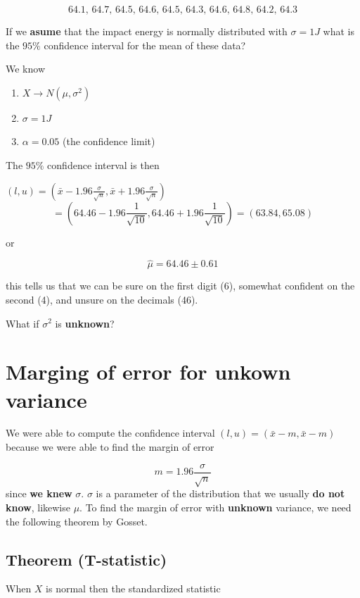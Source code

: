 \documentclass[
]{book}
\providecommand{\tightlist}{%
  \setlength{\itemsep}{0pt}\setlength{\parskip}{0pt}}
\begin{document}
\[64.1,\, 64.7,\, 64.5,\, 64.6,\, 64.5,\, 64.3,\, 64.6,\, 64.8,\, 64.2,\, 64.3\]

If we \textbf{asume} that the impact energy is normally distributed with \(\sigma=1J\) what is the \(95\%\) confidence interval for the mean of these data?

We know

\begin{enumerate}
\def\labelenumi{\arabic{enumi}.}
\tightlist
\item
  \(X \rightarrow N(\mu, \sigma^2)\)
\item
  \(\sigma=1J\)
\item
  \(\alpha=0.05\) (the confidence limit)
\end{enumerate}

The \(95\%\) confidence interval is then

\((l,u)=(\bar{x}-1.96 \frac{\sigma}{\sqrt{n}}, \bar{x}+1.96 \frac{\sigma}{\sqrt{n}})\)
\[=(64.46-1.96 \frac{1}{\sqrt{10}}, 64.46+1.96  \frac{1}{\sqrt{10}})=(63.84,65.08)\]

or

\[\hat{\mu}=64.46 \pm 0.61\]

this tells us that we can be sure on the first digit (6), somewhat confident on the second (4), and unsure on the decimals (46).

What if \(\sigma^2\) is \textbf{unknown}?

\hypertarget{marging-of-error-for-unkown-variance}{%
\section{Marging of error for unkown variance}\label{marging-of-error-for-unkown-variance}}

We were able to compute the confidence interval \((l,u)=(\bar{x} -m, \bar{x} -m)\) because we were able to find the margin of error

\[m=1.96 \frac{\sigma}{\sqrt{n}}\]
since \textbf{we knew} \(\sigma\). \(\sigma\) is a parameter of the distribution that we usually \textbf{do not know}, likewise \(\mu\). To find the margin of error with \textbf{unknown} variance, we need the following theorem by Gosset.

\hypertarget{theorem-t-statistic}{%
\subsection{Theorem (T-statistic)}\label{theorem-t-statistic}}

When \(X\) is normal then the standardized statistic
\end{document}
